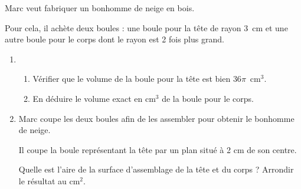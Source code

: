 
\medskip
Marc veut fabriquer un bonhomme de neige en bois.

Pour cela, il achète deux boules : une boule pour la tête de rayon 3~cm et
une autre boule pour le corps dont le rayon est 2 fois plus grand.

\medskip

\begin{enumerate}
\item 
	\begin{enumerate}
		\item Vérifier que le volume de la boule pour la tête est bien $36\pi$~cm$^3$.
		\item En déduire le volume exact en cm$^3$ de la boule pour le corps.
	\end{enumerate}
\item Marc coupe les deux boules afin de les assembler pour obtenir le bonhomme de
neige.

Il coupe la boule représentant la tête par un plan situé à 2 cm de son centre.

Quelle est l'aire de la surface d'assemblage de la tête et du corps ? Arrondir le
résultat au cm$^2$.
\end{enumerate}
\vspace{0.25cm}

